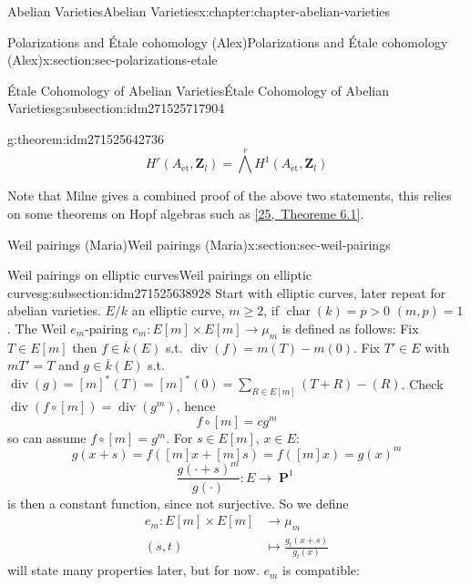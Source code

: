 \documentclass[oneside,10pt,]{book}
\numberwithin{equation}{section}
\newcommand{\lb}{[}
\newcommand{\rb}{]}
\newcommand{\ZZ}{\mathbf{Z}}
\newcommand{\et}{\mathrm{\acute{e}t}}
\DeclareMathOperator{\divisor}{div}
\DeclareMathOperator{\characteristic}{char}
\DeclareMathOperator{\PP}{\mathbf{P}}
\newcommand{\gt}{>}
\newcommand{\amp}{&}
\begin{document}
\begin{chapterptx}{Abelian Varieties}{}{Abelian Varieties}{}{}{x:chapter:chapter-abelian-varieties}
\begin{sectionptx}{Polarizations and Étale cohomology (Alex)}{}{Polarizations and Étale cohomology (Alex)}{}{}{x:section:sec-polarizations-etale}
\begin{subsectionptx}{Étale Cohomology of Abelian Varieties}{}{Étale Cohomology of Abelian Varieties}{}{}{g:subsection:idm271525717904}
\begin{theorem}{}{}{g:theorem:idm271525642736}
%
\begin{equation*}
H^r(A_\et, \ZZ_l) = \bigwedge^r H^1(A_\et, \ZZ_l)
\end{equation*}
%
\end{theorem}
Note that Milne gives a combined proof of the above two statements, this relies on some theorems on Hopf algebras such as \hyperlink{x:biblio:bib-borel-hopf}{[25,~Theoreme 6.1]}.%
\end{subsectionptx}
\end{sectionptx}
%
%
\typeout{************************************************}
\typeout{************************************************}
%
\begin{sectionptx}{Weil pairings (Maria)}{}{Weil pairings (Maria)}{}{}{x:section:sec-weil-pairings}
%
%
\typeout{************************************************}
\typeout{************************************************}
%
\begin{subsectionptx}{Weil pairings on elliptic curves}{}{Weil pairings on elliptic curves}{}{}{g:subsection:idm271525638928}
Start with elliptic curves, later repeat for abelian varieties. \(E/k\) an elliptic curve, \(m\ge 2\), if \(\characteristic(k) = p \gt 0\) \((m,p) = 1\). The Weil \(e_m\)-pairing \(e_m \colon E\lb m\rb \times E\lb m \rb \to \mu_m\) is defined as follows: Fix \(T\in E\lb m \rb\) then \(f\in \overline  k (E)\) s.t. \(\divisor(f) = m(T) - m(0)\). Fix \(T' \in E\) with \(mT' = T\) and \(g\in \overline k(E)\) s.t. \(\divisor(g) = \lb m \rb^*(T) = \lb m \rb^*(0)= \sum_{R\in E\lb m \rb} (T+R) - (R)\). Check \(\divisor (f\circ \lb m \rb) = \divisor(g^m)\), hence%
\begin{equation*}
f\circ [m] = c g^m
\end{equation*}
so can assume \(f\circ \lb m \rb = g^m\). For \(s \in E\lb m \rb\), \(x\in E\):%
\begin{equation*}
g(x + s) = f([m]x + [m]s) = f([m]x) = g(x)^m
\end{equation*}
%
\begin{equation*}
\frac{g(\cdot + s)^m}{g(\cdot)} \colon E \to \PP^1
\end{equation*}
is then a constant function, since not surjective. So we define%
\begin{align*}
e_m\colon E[m]\times E[m] \amp\to \mu_m\\
(s,t)\amp \mapsto \frac{g_t(x+s)}{g_t(x)}
\end{align*}
will state many properties later, but for now. \(e_m\) is compatible:%

\end{subsectionptx}
\end{sectionptx}
\end{chapterptx}
\end{document}
